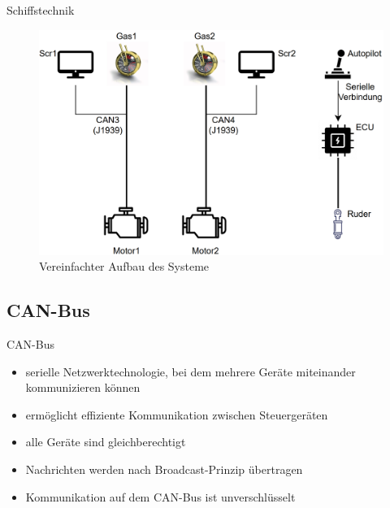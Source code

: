 \documentclass[usenames, dvipsnames, aspectratio=75]{beamer}
\begin{document}
\begin{frame}{Schiffstechnik}
    \begin{figure}
        \centering
        \includegraphics[width=1\linewidth]{assets/limandaSystem.png}
        \caption{Vereinfachter Aufbau des Systeme}
    \end{figure}
\end{frame}

\subsection{CAN-Bus}
\begin{frame}{CAN-Bus}
    \begin{itemize}
        \item serielle Netzwerktechnologie, bei dem mehrere Geräte miteinander kommunizieren können
        \item ermöglicht effiziente Kommunikation zwischen Steuergeräten
        \item alle Geräte sind gleichberechtigt
        \item Nachrichten werden nach Broadcast-Prinzip übertragen
        \item Kommunikation auf dem CAN-Bus ist unverschlüsselt
    \end{itemize}
\end{frame}
\end{document}
